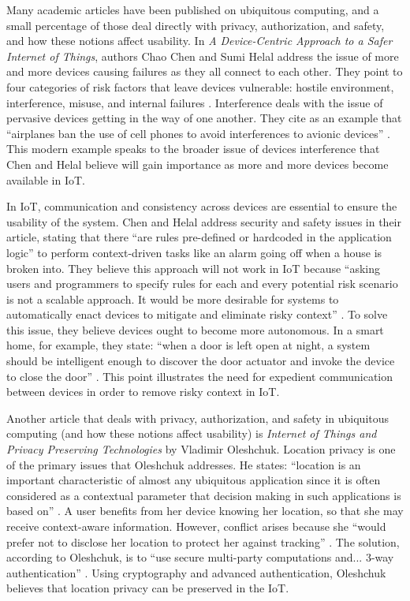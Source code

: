 \documentclass[11pt, oneside]{article}   	%
\begin{document}
Many academic articles have been published on ubiquitous computing, and a small percentage of those deal directly with privacy, authorization, and safety, and how these notions affect usability. In \textit{A Device-Centric Approach to a Safer Internet of Things}, authors Chao Chen and Sumi Helal address the issue of more and more devices causing failures as they all connect to each other. They point to four categories of risk factors that leave devices vulnerable: hostile environment, interference, misuse, and internal failures \cite{chenandhelal}. Interference deals with the issue of pervasive devices getting in the way of one another. They cite as an example that ``airplanes ban the use of cell phones to avoid interferences to avionic devices'' \cite{chenandhelal}. This modern example speaks to the broader issue of devices interference that Chen and Helal believe will gain importance as more and more devices become available in IoT.

In IoT, communication and consistency across devices are essential to ensure the usability of the system. Chen and Helal address security and safety issues in their article, stating that there ``are rules pre-defined or hardcoded in the application logic'' to perform context-driven tasks like an alarm going off when a house is broken into. They believe this approach will not work in IoT because ``asking users and programmers to specify rules for each and every potential risk scenario is not a scalable approach. It would be more desirable for systems to automatically enact devices to mitigate and eliminate risky context'' \cite{chenandhelal}. To solve this issue, they believe devices ought to become more autonomous. In a smart home, for example, they state: ``when a door is left open at night, a system should be intelligent enough to discover the door actuator and invoke the device to close the door'' \cite{chenandhelal}. This point illustrates the need for expedient communication between devices in order to remove risky context in IoT.

Another article that deals with privacy, authorization, and safety in ubiquitous computing (and how these notions affect usability) is \textit{Internet of Things and Privacy Preserving Technologies} by Vladimir Oleshchuk. Location privacy is one of the primary issues that Oleshchuk addresses. He states: ``location is an important characteristic of almost any ubiquitous application since it is often considered as a contextual parameter that decision making in such applications is based on'' \cite{oleshchuk}. A user benefits from her device knowing her location, so that she may receive context-aware information. However, conflict arises because she ``would prefer not to disclose her location to protect her against tracking'' \cite{oleshchuk}. The solution, according to Oleshchuk, is to ``use secure multi-party computations and... 3-way authentication'' \cite{oleshchuk}. Using cryptography and advanced authentication, Oleshchuk believes that location privacy can be preserved in the IoT.
\end{document}
